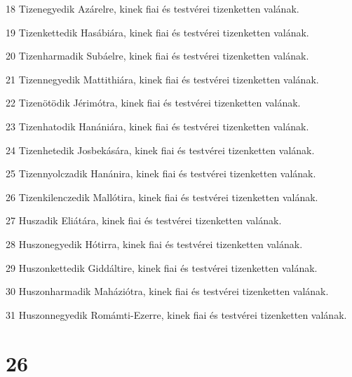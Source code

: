 \par 18 Tizenegyedik Azárelre, kinek fiai és testvérei tizenketten valának.
\par 19 Tizenkettedik Hasábiára, kinek fiai és testvérei tizenketten valának.
\par 20 Tizenharmadik Subáelre, kinek fiai és testvérei tizenketten valának.
\par 21 Tizennegyedik Mattithiára, kinek fiai és testvérei tizenketten valának.
\par 22 Tizenötödik Jérimótra, kinek fiai és testvérei tizenketten valának.
\par 23 Tizenhatodik Hanániára, kinek fiai és testvérei tizenketten valának.
\par 24 Tizenhetedik Josbekására, kinek fiai és testvérei tizenketten valának.
\par 25 Tizennyolczadik Hanánira, kinek fiai és testvérei tizenketten valának.
\par 26 Tizenkilenczedik Mallótira, kinek fiai és testvérei tizenketten valának.
\par 27 Huszadik Eliátára, kinek fiai és testvérei tizenketten valának.
\par 28 Huszonegyedik Hótirra, kinek fiai és testvérei tizenketten valának.
\par 29 Huszonkettedik Giddáltire, kinek fiai és testvérei tizenketten valának.
\par 30 Huszonharmadik Maháziótra, kinek fiai és testvérei tizenketten valának.
\par 31 Huszonnegyedik Romámti-Ezerre, kinek fiai és testvérei tizenketten valának.

\chapter{26}

